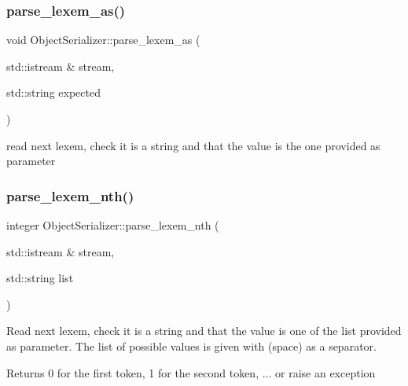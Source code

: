 \subsubsection{\texorpdfstring{parse\+\_\+lexem\+\_\+as()}{parse\_lexem\_as()}}
{\footnotesize\ttfamily void Object\+Serializer\+::parse\+\_\+lexem\+\_\+as (\begin{DoxyParamCaption}\item[{std\+::istream \&}]{stream,  }\item[{std\+::string}]{expected }\end{DoxyParamCaption})\hspace{0.3cm}{\ttfamily [static]}}

read next lexem, check it is a string and that the value is the one provided as parameter \mbox{\label{classez_1_1objects_1_1ObjectSerializer_adec5d6150d5944b7a5b3899e3b17d074}} 
\subsubsection{\texorpdfstring{parse\+\_\+lexem\+\_\+nth()}{parse\_lexem\_nth()}}
{\footnotesize\ttfamily integer Object\+Serializer\+::parse\+\_\+lexem\+\_\+nth (\begin{DoxyParamCaption}\item[{std\+::istream \&}]{stream,  }\item[{std\+::string}]{list }\end{DoxyParamCaption})\hspace{0.3cm}{\ttfamily [static]}}

Read next lexem, check it is a string and that the value is one of the list provided as parameter. The list of possible values is given with \textquotesingle{} \textquotesingle{} (space) as a separator. \begin{DoxyReturn}{Returns}
0 for the first token, 1 for the second token, ... or raise an exception 
\end{DoxyReturn}
\mbox{\label{classez_1_1objects_1_1ObjectSerializer_a591158e6375b60f82c58294a866263f8}} 
